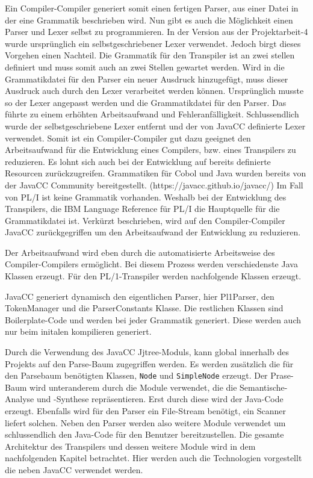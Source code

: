 Ein Compiler-Compiler generiert somit einen fertigen Parser, aus einer Datei in der eine Grammatik beschrieben wird. Nun gibt es auch die Möglichkeit einen Parser und Lexer selbst zu programmieren. In der Version aus der Projektarbeit-4 wurde ursprünglich ein selbstgeschriebener Lexer verwendet.
Jedoch birgt dieses Vorgehen einen Nachteil. Die Grammatik für den Transpiler ist an zwei stellen definiert und muss somit auch an zwei Stellen gewartet werden.
Wird in die Grammatikdatei für den Parser ein neuer Ausdruck hinzugefügt, muss dieser Ausdruck auch durch den Lexer verarbeitet werden können.
Ursprünglich musste so der Lexer angepasst werden und die Grammatikdatei für den Parser. 
Das führte zu einem erhöhten Arbeitsaufwand und Fehleranfälligkeit. Schlussendlich wurde der selbstgeschriebene Lexer entfernt und der von JavaCC definierte Lexer verwendet.
Somit ist ein Compiler-Compiler gut dazu geeignet den Arbeitsaufwand für die Entwicklung eines Compilers, bzw. eines Transpilers zu reduzieren. 
Es lohnt sich auch bei der Entwicklung auf bereits definierte Resourcen zurückzugreifen. 
Grammatiken für Cobol und Java wurden bereits von der JavaCC Community bereitgestellt. (https://javacc.github.io/javacc/)
Im Fall von PL/I ist keine Grammatik vorhanden. Weshalb bei der Entwicklung des Transpilers, die IBM Language Reference für PL/I die Hauptquelle für die Grammatikdatei ist.  
Verkürzt beschrieben, wird auf den Compiler-Compiler JavaCC zurückgegriffen um den Arbeitsaufwand der Entwicklung zu reduzieren. 

Der Arbeitsaufwand wird eben durch die automatisierte Arbeitsweise des Compiler-Compilers ermöglicht. Bei diesem Prozess werden verschiedenste Java Klassen erzeugt. Für den PL/1-Transpiler werden nachfolgende Klassen erzeugt.


JavaCC generiert dynamisch den eigentlichen Parser, hier Pl1Parser, den TokenManager und die ParserConstants Klasse. Die restlichen Klassen sind Boilerplate-Code und werden bei jeder Grammatik generiert. Diese werden auch nur beim initalen kompilieren generiert.

Durch die Verwendung des JavaCC Jjtree-Moduls, kann global innerhalb des Projekts auf den Parse-Baum zugegriffen werden. 
Es werden zusätzlich die für den Parsebaum benötigten Klassen, \verb+Node+ und \verb+SimpleNode+ erzeugt.
Der Prase-Baum wird unteranderem durch die Module verwendet, die die Semantische-Analyse und -Synthese repräsentieren.
Erst durch diese wird der Java-Code erzeugt.
Ebenfalls wird für den Parser ein File-Stream benötigt, ein Scanner liefert solchen.
Neben den Parser werden also weitere Module verwendet um schlussendlich den Java-Code für den Benutzer bereitzustellen.
Die gesamte Architektur des Transpilers und dessen weitere Module wird in dem nachfolgenden Kapitel betrachtet. 
Hier werden auch die Technologien vorgestellt die neben JavaCC verwendet werden. 

